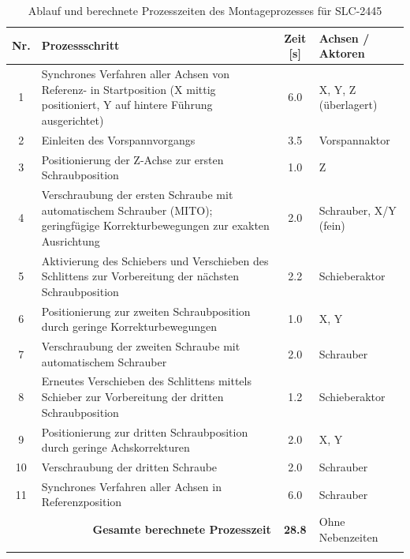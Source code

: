 \begin{longtable}{|c|p{7.5cm}|c|p{3.5cm}|}
\hline
\textbf{Nr.} & \textbf{Prozessschritt} & \textbf{Zeit [s]} & \textbf{Achsen / Aktoren} \\
\hline
\endfirsthead

\hline
\endhead
\endfoot
\endlastfoot

1 &
Synchrones Verfahren aller Achsen von Referenz- in Startposition (X mittig positioniert, Y auf hintere Führung ausgerichtet) &
6.0 &
X, Y, Z (überlagert) \\
\hline

2 &
Einleiten des Vorspannvorgangs &
3.5 &
Vorspannaktor \\
\hline

3 &
Positionierung der Z-Achse zur ersten Schraubposition &
1.0 &
Z \\
\hline

4 &
Verschraubung der ersten Schraube mit automatischem Schrauber (MITO); geringfügige Korrekturbewegungen zur exakten Ausrichtung &
2.0 &
Schrauber, X/Y (fein) \\
\hline

5 &
Aktivierung des Schiebers und Verschieben des Schlittens zur Vorbereitung der nächsten Schraubposition &
2.2 &
Schieberaktor \\
\hline

6 &
Positionierung zur zweiten Schraubposition durch geringe Korrekturbewegungen &
1.0 &
X, Y \\
\hline

7 &
Verschraubung der zweiten Schraube mit automatischem Schrauber &
2.0 &
Schrauber \\
\hline

8 &
Erneutes Verschieben des Schlittens mittels Schieber zur Vorbereitung der dritten Schraubposition &
1.2 &
Schieberaktor \\
\hline

9 &
Positionierung zur dritten Schraubposition durch geringe Achskorrekturen &
2.0 &
X, Y \\
\hline

10 &
Verschraubung der dritten Schraube &
2.0 &
Schrauber \\
\hline

11 &
Synchrones Verfahren aller Achsen in Referenzposition &
6.0 &
Schrauber \\
\hline

\multicolumn{2}{|r|}{\textbf{Gesamte berechnete Prozesszeit}} &
\textbf{28.8} &
Ohne Nebenzeiten \\
\hline
\caption{Ablauf und berechnete Prozesszeiten des Montageprozesses für SLC-2445}
\label{tab:prozesszeiten_slc2445} \\
\end{longtable}


